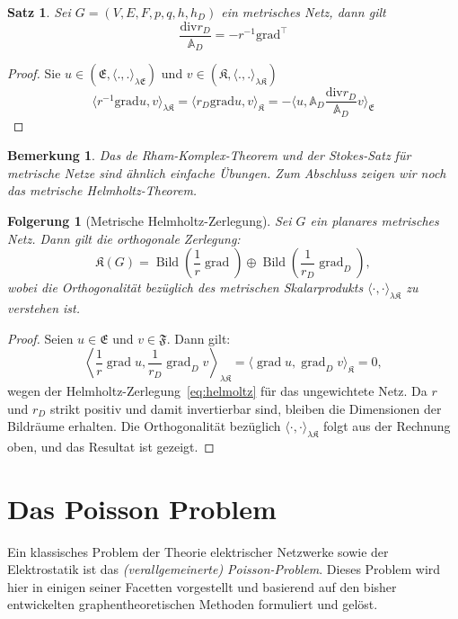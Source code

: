 \documentclass[11pt,a4paper,leqno]{report}
\newtheorem{proposition}{Satz}[chapter]
\newtheorem{corollary}[theorem]{Folgerung}
\newtheorem{remark}[theorem]{Bemerkung}
\numberwithin{equation}{chapter}
\begin{document}
\begin{proposition}\label{prop:metr_adj}
	Sei $G=(V,E,F,p,q,h,h_D)$ ein metrisches Netz, dann gilt
\[
	\frac{\mathrm{div}r_D}{\mathbb{A}_D} = - r^{-1}\mathrm{grad}^\top
\]
\end{proposition}
\begin{proof}
	Sie $u\in (\mathfrak{E}, \langle ., . \rangle_{\lambda\mathfrak{E}})$ und $v\in (\mathfrak{K}, \langle ., . \rangle_{\lambda\mathfrak{K}})$
	\[
	\langle r^{-1}\mathrm{grad}u, v \rangle_{\lambda\mathfrak{K}} = \langle r_D\mathrm{grad}u, v \rangle_{\mathfrak{K}}= -\langle u, \mathbb{A}_D\frac{\mathrm{div}r_D}{\mathbb{A}_D}v \rangle_{\mathfrak{E}}
	\]
\end{proof}
\begin{remark}
	Das de Rham-Komplex-Theorem und der Stokes-Satz für metrische Netze sind ähnlich einfache Übungen. 
	Zum Abschluss zeigen wir noch das metrische Helmholtz-Theorem.
\end{remark}

\begin{corollary}[Metrische Helmholtz-Zerlegung]\label{cor:metrisch_helmholtz}
	Sei \(G\) ein planares metrisches Netz. Dann gilt die orthogonale Zerlegung:
	\[
	\mathfrak{K}(G) = \operatorname{Bild}\!\left(\frac{1}{r}\operatorname{grad}\right) 
	\oplus \operatorname{Bild}\!\left(\frac{1}{r_D}\operatorname{grad}_D\right),
	\]
	wobei die Orthogonalität bezüglich des metrischen Skalarprodukts 
	\(\langle\cdot,\cdot\rangle_{\lambda\mathfrak{K}}\) zu verstehen ist.
\end{corollary}

\begin{proof}
	Seien \(u \in \mathfrak{E}\) und \(v \in \mathfrak{F}\). Dann gilt:
	\[
	\left\langle \frac{1}{r}\operatorname{grad}u, \frac{1}{r_D}\operatorname{grad}_D v\right\rangle_{\lambda\mathfrak{K}}
	= \bigl\langle\operatorname{grad}u, \operatorname{grad}_D v\bigr\rangle_{\mathfrak{K}} = 0,
	\]
	wegen der Helmholtz-Zerlegung~\ref{eq:helmoltz} für das ungewichtete Netz. 
	Da \(r\) und \(r_D\) strikt positiv und damit invertierbar sind, bleiben die 
	Dimensionen der Bildräume erhalten. Die Orthogonalität bezüglich 
	\(\langle\cdot,\cdot\rangle_{\lambda\mathfrak{K}}\) folgt aus der Rechnung oben, 
	und das Resultat ist gezeigt.
\end{proof}

\chapter{Das Poisson Problem}
Ein klassisches Problem der Theorie elektrischer Netzwerke sowie der Elektrostatik ist das \emph{(verallgemeinerte) Poisson-Problem}. 
Dieses Problem wird hier in einigen seiner Facetten vorgestellt und basierend auf den bisher entwickelten graphentheoretischen Methoden formuliert und gelöst.
\end{document}
